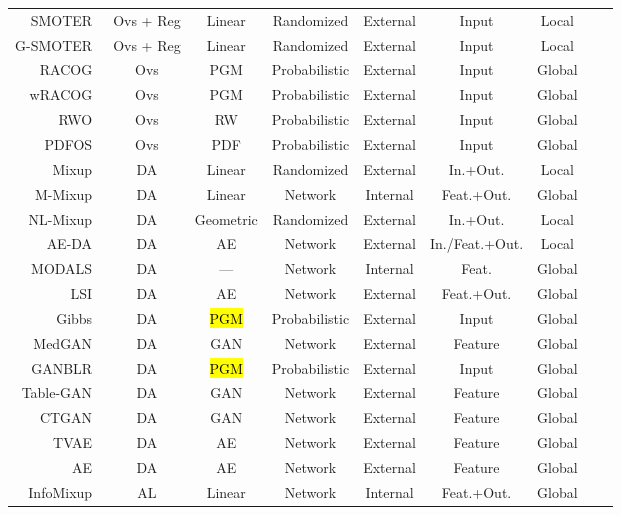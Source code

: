\documentclass[parskip=full]{scrartcl}
\begin{document}
\begin{longtable}{rcccccccc}
    SMOTER~\cite{torgo2013smote} & Ovs + Reg & Linear & Randomized & External & Input & Local \\
    G-SMOTER~\cite{camacho2022geometric} & Ovs + Reg & Linear & Randomized & External & Input & Local \\
    RACOG~\cite{das2014racog} & Ovs & PGM & Probabilistic & External & Input & Global \\
    wRACOG~\cite{das2014racog} & Ovs & PGM & Probabilistic & External & Input & Global \\
    RWO~\cite{zhang2014rwo} & Ovs & RW & Probabilistic & External & Input & Global \\
    PDFOS~\cite{gao2014pdfos} & Ovs & PDF & Probabilistic & External & Input & Global \\
    Mixup~\cite{zhang2018mixup} & DA & Linear & Randomized & External & In.+Out. & Local \\
    M-Mixup~\cite{verma2019manifold} & DA & Linear & Network & Internal & Feat.+Out. & Global \\
    NL-Mixup~\cite{guo2020nonlinear} & DA & Geometric & Randomized & External & In.+Out. & Local \\
    AE-DA~\cite{feng2020autuencoder} & DA & AE & Network & External & In./Feat.+Out. & Local \\
    MODALS~\cite{cheung2020modals} & DA & --- & Network & Internal & Feat. & Global \\
    LSI~\cite{liu2018data} & DA & AE & Network & External & Feat.+Out. & Global \\
    Gibbs~\cite{fakoor2020fast} & DA & \hl{PGM} & Probabilistic & External & Input & Global \\
    MedGAN~\cite{armanious2020medgan} & DA & GAN & Network & External & Feature & Global \\
    GANBLR~\cite{zhang2021ganblr} & DA & \hl{PGM} & Probabilistic & External & Input & Global \\
    Table-GAN~\cite{park2018data} & DA & GAN & Network & External & Feature & Global \\
    CTGAN~\cite{xu2019modeling} & DA & GAN & Network & External & Feature & Global \\
    TVAE~\cite{xu2019modeling} & DA & AE & Network & External & Feature & Global \\
    AE~\cite{delgado2021deep} & DA & AE & Network & External & Feature & Global \\
    InfoMixup~\cite{kim2021lada} & AL & Linear & Network & Internal & Feat.+Out. & Global \\

\end{longtable}
\end{document}
